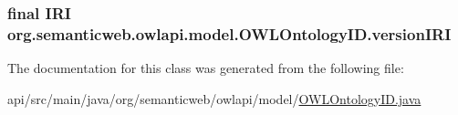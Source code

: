 \hypertarget{classorg_1_1semanticweb_1_1owlapi_1_1model_1_1_o_w_l_ontology_i_d_a1e7ae2498d335c2596f41a49a61c100a}{
\subsubsection[{version\-I\-R\-I}]{\setlength{\rightskip}{0pt plus 5cm}final {\bf I\-R\-I} org.\-semanticweb.\-owlapi.\-model.\-O\-W\-L\-Ontology\-I\-D.\-version\-I\-R\-I\hspace{0.3cm}{\ttfamily [private]}}}\label{classorg_1_1semanticweb_1_1owlapi_1_1model_1_1_o_w_l_ontology_i_d_a1e7ae2498d335c2596f41a49a61c100a}


The documentation for this class was generated from the following file\-:\begin{DoxyCompactItemize}
\item 
api/src/main/java/org/semanticweb/owlapi/model/\hyperlink{_o_w_l_ontology_i_d_8java}{O\-W\-L\-Ontology\-I\-D.\-java}\end{DoxyCompactItemize}
